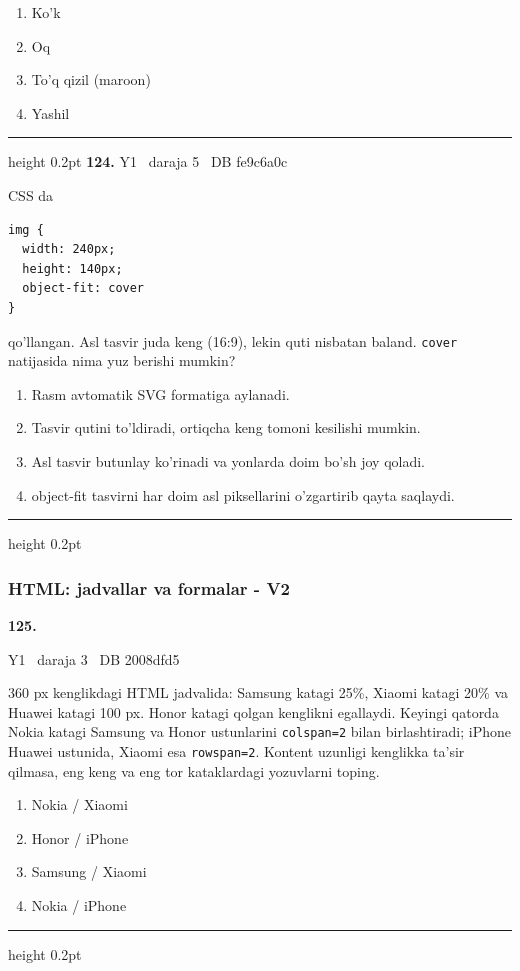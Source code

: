 \documentclass[10pt,a4paper,oneside]{article}
\begin{document}
\begin{enumerate}[label=\Alph*),leftmargin=9mm]
\item Ko'k
\item Oq
\item To'q qizil (maroon)
\item Yashil
\end{enumerate}
\vspace{2mm}\hrule height 0.2pt \vspace{4mm}
\hypertarget{q124}{\textbf{\color{ink}124.}}  {\color{muted}\scriptsize Y1 \textbullet\ daraja 5 \textbullet\ DB fe9c6a0c}
\par
CSS da

\par
\begin{lstlisting}
img {
  width: 240px;
  height: 140px;
  object-fit: cover
}
\end{lstlisting}


\par
qo'llangan. Asl tasvir juda keng (16:9), lekin quti nisbatan baland. \texttt{cover} natijasida nima yuz berishi mumkin?
\begin{enumerate}[label=\Alph*),leftmargin=9mm]
\item Rasm avtomatik SVG formatiga aylanadi.
\item Tasvir qutini to'ldiradi, ortiqcha keng tomoni kesilishi mumkin.
\item Asl tasvir butunlay ko'rinadi va yonlarda doim bo'sh joy qoladi.
\item object-fit tasvirni har doim asl piksellarini o'zgartirib qayta saqlaydi.
\end{enumerate}
\vspace{2mm}\hrule height 0.2pt \vspace{4mm}
\subsubsection{HTML: jadvallar va formalar - V2}
\hypertarget{q125}{\textbf{\color{ink}125.}}  {\color{muted}\scriptsize Y1 \textbullet\ daraja 3 \textbullet\ DB 2008dfd5}
\par
360 px kenglikdagi HTML jadvalida: Samsung katagi 25\%, Xiaomi katagi 20\% va Huawei katagi 100 px. Honor katagi qolgan kenglikni egallaydi. Keyingi qatorda Nokia katagi Samsung va Honor ustunlarini \texttt{colspan=2} bilan birlashtiradi; iPhone Huawei ustunida, Xiaomi esa \texttt{rowspan=2}. Kontent uzunligi kenglikka ta'sir qilmasa, eng keng va eng tor kataklardagi yozuvlarni toping.
\begin{enumerate}[label=\Alph*),leftmargin=9mm]
\item Nokia / Xiaomi
\item Honor / iPhone
\item Samsung / Xiaomi
\item Nokia / iPhone
\end{enumerate}
\vspace{2mm}\hrule height 0.2pt \vspace{4mm}
\end{document}
